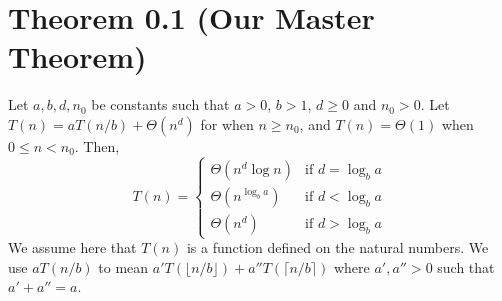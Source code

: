 \documentclass{article}
\begin{document}
\section*{Theorem 0.1 (Our Master Theorem)}
Let $a, b, d, n_0$ be constants such that $a > 0$, $b > 1$, $d \ge 0$ and $n_0 > 0$.
Let $T(n) = aT(n/b) + \Theta(n^d)$ for when $n \ge n_0$, and $T(n) = \Theta(1)$ when $0 \le n < n_0$. Then,
\[
T(n) = \begin{cases}
    \Theta(n^d \log n) & \text{if } d = \log_b a \\
    \Theta(n^{\log_b a}) & \text{if } d < \log_b a \\
    \Theta(n^d) & \text{if } d > \log_b a
\end{cases}
\]
We assume here that $T(n)$ is a function defined on the natural numbers. We use $aT(n/b)$ to mean $a'T(\lfloor n/b \rfloor) + a''T(\lceil n/b \rceil)$ where $a', a'' > 0$ such that $a' + a'' = a$.
\end{document}
